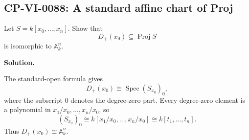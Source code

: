
\subsection*{CP-VI-0088: A standard affine chart of Proj}

Let $S=k[x_0,\dots,x_n]$. Show that
\[
D_+(x_0)\subseteq\operatorname{Proj}S
\]
is isomorphic to $\mathbb A_k^n$.

\medskip
\noindent\textbf{Solution.}

The standard-open formula gives
\[
D_+(x_0)\cong\operatorname{Spec}(S_{x_0})_0,
\]
where the subscript $0$ denotes the degree-zero part. Every degree-zero element is a polynomial in $x_1/x_0,\dots,x_n/x_0$, so
\[
(S_{x_0})_0\cong k[x_1/x_0,\dots,x_n/x_0]\cong k[t_1,\dots,t_n].
\]
Thus $D_+(x_0)\cong\mathbb A_k^n$.
